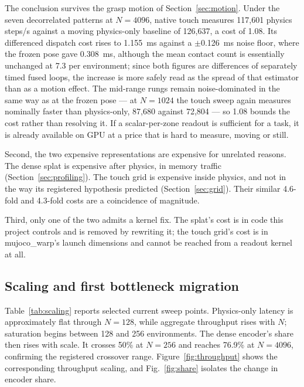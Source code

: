 \documentclass[journal]{IEEEtran}
\begin{document}
The conclusion survives the grasp motion of Section~\ref{sec:motion}. Under the seven decorrelated patterns at $N=4096$, native touch measures 117,601 physics steps/s against a moving physics-only baseline of 126,637, a cost of 1.08. Its differenced dispatch cost rises to 1.155~ms against a $\pm$0.126~ms noise floor, where the frozen pose gave 0.308~ms, although the mean contact count is essentially unchanged at 7.3 per environment; since both figures are differences of separately timed fused loops, the increase is more safely read as the spread of that estimator than as a motion effect. The mid-range rungs remain noise-dominated in the same way as at the frozen pose --- at $N=1024$ the touch sweep again measures nominally faster than physics-only, 87,680 against 72,804 --- so 1.08 bounds the cost rather than resolving it. If a scalar-per-zone readout is sufficient for a task, it is already available on GPU at a price that is hard to measure, moving or still.

Second, the two expensive representations are expensive for unrelated reasons. The dense splat is expensive after physics, in memory traffic (Section~\ref{sec:profiling}). The touch grid is expensive inside physics, and not in the way its registered hypothesis predicted (Section~\ref{sec:grid}). Their similar 4.6-fold and 4.3-fold costs are a coincidence of magnitude.

Third, only one of the two admits a kernel fix. The splat's cost is in code this project controls and is removed by rewriting it; the touch grid's cost is in mujoco\_warp's launch dimensions and cannot be reached from a readout kernel at all.

\subsection{Scaling and first bottleneck migration}

Table~\ref{tab:scaling} reports selected current sweep points. Physics-only latency is approximately flat through $N=128$, while aggregate throughput rises with $N$; saturation begins between 128 and 256 environments. The dense encoder's share then rises with scale. It crosses 50\% at $N=256$ and reaches 76.9\% at $N=4096$, confirming the registered crossover range. Figure~\ref{fig:throughput} shows the corresponding throughput scaling, and Fig.~\ref{fig:share} isolates the change in encoder share.
\end{document}
